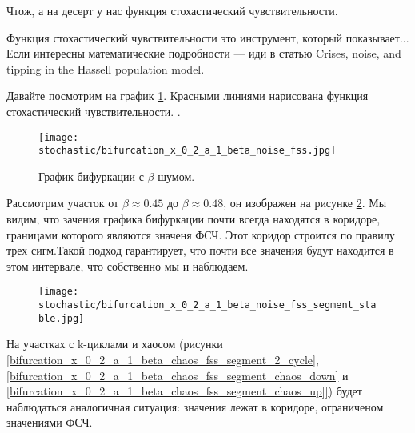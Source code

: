         Чтож, а на десерт у нас функция стохастический чувствительности.

        Функция стохастический чувствительности это инструмент, который показывает... Если интересны математические подробности --- иди в статью Crises, noise, and tipping in the Hassell population model.

        Давайте посмотрим на график \ref{bifurcation_x_0_2_a_1_beta_chaos_fss}. Красными линиями нарисована функция стохастический чувствительности. . 

        \begin{figure}
            \centering
            \texttt{[image: stochastic/bifurcation\_x\_0\_2\_a\_1\_beta\_noise\_fss.jpg]}
        
            \captionsetup{justification=centering}
            \caption{График бифуркации с \(\beta\)-шумом.}
            \label{bifurcation_x_0_2_a_1_beta_chaos_fss}
        \end{figure}

        Рассмотрим участок от \(\beta \approx 0.45\) до \(\beta \approx 0.48\), он изображен на рисунке \ref{bifurcation_x_0_2_a_1_beta_chaos_fss_segment_stable}. Мы видим, что зачения графика бифуркации почти всегда находятся в коридоре, границами которого являются значеня ФСЧ. Этот коридор строится по правилу трех сигм.Такой подход гарантирует, что почти все значения будут находится в этом интервале, что собственно мы и наблюдаем.

        \begin{figure}
            \centering
            \texttt{[image: stochastic/bifurcation\_x\_0\_2\_a\_1\_beta\_noise\_fss\_segment\_stable.jpg]}
        
            \captionsetup{justification=centering}
            \caption{}
            \label{bifurcation_x_0_2_a_1_beta_chaos_fss_segment_stable}
        \end{figure}

        На участках с k-циклами и хаосом (рисунки \ref{bifurcation_x_0_2_a_1_beta_chaos_fss_segment_2_cycle}, \ref{bifurcation_x_0_2_a_1_beta_chaos_fss_segment_chaos_down} и \ref{bifurcation_x_0_2_a_1_beta_chaos_fss_segment_chaos_up]}) будет наблюдаться аналогичная ситуация: значения лежат в коридоре, ограниченом значениями ФСЧ.


